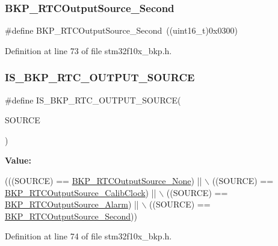 \subsubsection{\texorpdfstring{B\+K\+P\+\_\+\+R\+T\+C\+Output\+Source\+\_\+\+Second}{BKP\_RTCOutputSource\_Second}}
{\footnotesize\ttfamily \#define B\+K\+P\+\_\+\+R\+T\+C\+Output\+Source\+\_\+\+Second~((uint16\+\_\+t)0x0300)}



Definition at line 73 of file stm32f10x\+\_\+bkp.\+h.

\mbox{\label{group___r_t_c__output__source__to__output__on__the___tamper__pin_gac59454ee255feb55b5e14c34b70c99da}} 
\subsubsection{\texorpdfstring{I\+S\+\_\+\+B\+K\+P\+\_\+\+R\+T\+C\+\_\+\+O\+U\+T\+P\+U\+T\+\_\+\+S\+O\+U\+R\+CE}{IS\_BKP\_RTC\_OUTPUT\_SOURCE}}
{\footnotesize\ttfamily \#define I\+S\+\_\+\+B\+K\+P\+\_\+\+R\+T\+C\+\_\+\+O\+U\+T\+P\+U\+T\+\_\+\+S\+O\+U\+R\+CE(\begin{DoxyParamCaption}\item[{}]{S\+O\+U\+R\+CE }\end{DoxyParamCaption})}

{\bfseries Value\+:}
\begin{DoxyCode}
(((SOURCE) == \hyperlink{group___r_t_c__output__source__to__output__on__the___tamper__pin_ga8a18950396b2db70311480ab76464c6e}{BKP\_RTCOutputSource\_None}) || \(\backslash\)
                                          ((SOURCE) == 
      \hyperlink{group___r_t_c__output__source__to__output__on__the___tamper__pin_ga6fd7cb80bb52bca65641cbe6aa2c4590}{BKP\_RTCOutputSource\_CalibClock}) || \(\backslash\)
                                          ((SOURCE) == \hyperlink{group___r_t_c__output__source__to__output__on__the___tamper__pin_gac016224386421d0cb1c0cd0ee201d65a}{BKP\_RTCOutputSource\_Alarm}) 
      || \(\backslash\)
                                          ((SOURCE) == 
      \hyperlink{group___r_t_c__output__source__to__output__on__the___tamper__pin_ga23cb72635820331317ee4ee5a7897a70}{BKP\_RTCOutputSource\_Second}))
\end{DoxyCode}


Definition at line 74 of file stm32f10x\+\_\+bkp.\+h.

